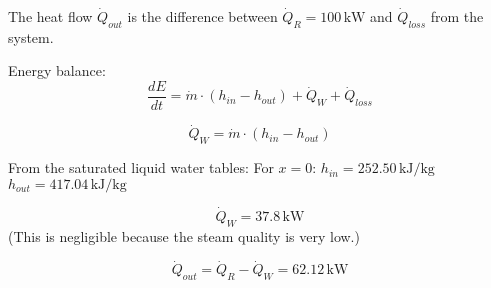 The heat flow \( \dot{Q}_{out} \) is the difference between \( \dot{Q}_R = 100 \, \text{kW} \) and \( \dot{Q}_{loss} \) from the system.  

Energy balance:  
\[ \frac{dE}{dt} = \dot{m} \cdot (h_{in} - h_{out}) + \dot{Q}_W + \dot{Q}_{loss} \]  

\[ \dot{Q}_W = \dot{m} \cdot (h_{in} - h_{out}) \]  

From the saturated liquid water tables:  
For \( x = 0 \):  
\( h_{in} = 252.50 \, \text{kJ/kg} \)  
\( h_{out} = 417.04 \, \text{kJ/kg} \)  

\[ \dot{Q}_W = 37.8 \, \text{kW} \]  
(This is negligible because the steam quality is very low.)  

\[ \dot{Q}_{out} = \dot{Q}_R - \dot{Q}_W = 62.12 \, \text{kW} \]